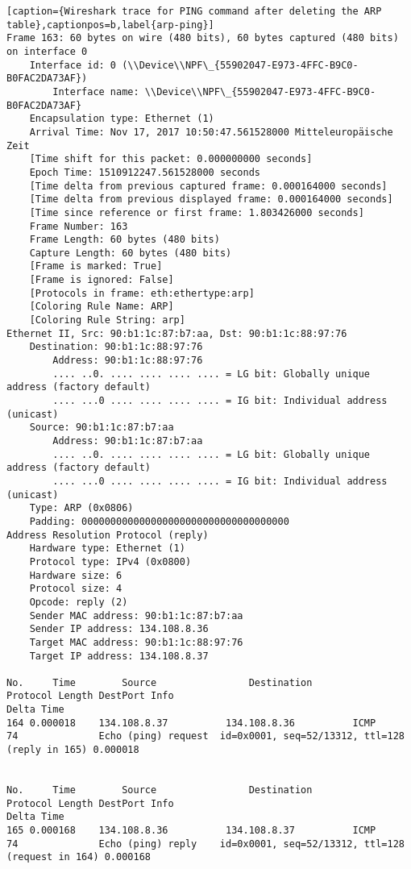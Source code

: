 \begin{lstlisting}[caption={Wireshark trace for PING command after deleting the ARP table},captionpos=b,label{arp-ping}]
Frame 163: 60 bytes on wire (480 bits), 60 bytes captured (480 bits) on interface 0
	Interface id: 0 (\\Device\\NPF\_{55902047-E973-4FFC-B9C0-B0FAC2DA73AF})
		Interface name: \\Device\\NPF\_{55902047-E973-4FFC-B9C0-B0FAC2DA73AF}
	Encapsulation type: Ethernet (1)
	Arrival Time: Nov 17, 2017 10:50:47.561528000 Mitteleuropäische Zeit
	[Time shift for this packet: 0.000000000 seconds]
	Epoch Time: 1510912247.561528000 seconds
	[Time delta from previous captured frame: 0.000164000 seconds]
	[Time delta from previous displayed frame: 0.000164000 seconds]
	[Time since reference or first frame: 1.803426000 seconds]
	Frame Number: 163
	Frame Length: 60 bytes (480 bits)
	Capture Length: 60 bytes (480 bits)
	[Frame is marked: True]
	[Frame is ignored: False]
	[Protocols in frame: eth:ethertype:arp]
	[Coloring Rule Name: ARP]
	[Coloring Rule String: arp]
Ethernet II, Src: 90:b1:1c:87:b7:aa, Dst: 90:b1:1c:88:97:76
	Destination: 90:b1:1c:88:97:76
		Address: 90:b1:1c:88:97:76
		.... ..0. .... .... .... .... = LG bit: Globally unique address (factory default)
		.... ...0 .... .... .... .... = IG bit: Individual address (unicast)
	Source: 90:b1:1c:87:b7:aa
		Address: 90:b1:1c:87:b7:aa
		.... ..0. .... .... .... .... = LG bit: Globally unique address (factory default)
		.... ...0 .... .... .... .... = IG bit: Individual address (unicast)
	Type: ARP (0x0806)
	Padding: 000000000000000000000000000000000000
Address Resolution Protocol (reply)
	Hardware type: Ethernet (1)
	Protocol type: IPv4 (0x0800)
	Hardware size: 6
	Protocol size: 4
	Opcode: reply (2)
	Sender MAC address: 90:b1:1c:87:b7:aa
	Sender IP address: 134.108.8.36
	Target MAC address: 90:b1:1c:88:97:76
	Target IP address: 134.108.8.37

No.     Time        Source                Destination           Protocol Length DestPort Info                                                            Delta Time
164 0.000018    134.108.8.37          134.108.8.36          ICMP     74              Echo (ping) request  id=0x0001, seq=52/13312, ttl=128 (reply in 165) 0.000018


No.     Time        Source                Destination           Protocol Length DestPort Info                                                            Delta Time
165 0.000168    134.108.8.36          134.108.8.37          ICMP     74              Echo (ping) reply    id=0x0001, seq=52/13312, ttl=128 (request in 164) 0.000168



\end{lstlisting}
